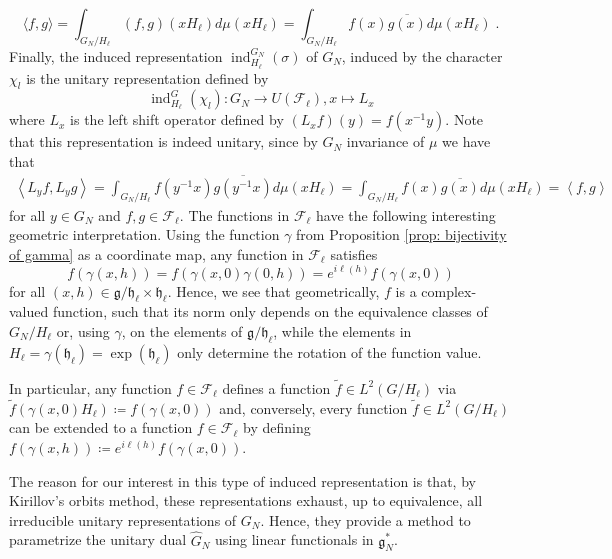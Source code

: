 \documentclass[pdflatex,sn-mathphys-num]{sn-jnl}
\theoremstyle{thmstyletwo}
\theoremstyle{thmstyleone}
\theoremstyle{thmstyletwo}
\newcommand{\fancyh}{\mathfrak{h}}
\newcommand{\fancyg}{\mathfrak{g}}
\begin{document}
	\begin{equation*}
		\langle f, g\rangle=\int_{G_N/H_{\ell}} (f,g)(xH_{\ell})d \mu(x H_{\ell}) = \int_{G_N/H_{\ell}} f(x)\overline{g(x)}d \mu(xH_{\ell})\;.
	\end{equation*}
	Finally, the induced representation $\operatorname{ind}_{H_{\ell}}^{G_N}(\sigma)$ of $G_N$, induced by the character $\chi_l$ is the unitary representation defined by
	\begin{equation*}
		\operatorname{ind}_{H_\ell}^{G}(\chi_l): G_N \to U(\mathcal{F}_\ell), x \mapsto L_x
	\end{equation*}
	where $L_x$ is the left shift operator defined by $(L_xf)(y) = f(x^{-1}y)$. Note that this representation is indeed unitary, since by $G_N$ invariance of $\mu$ we have that 
	\begin{align*}
		\left\langle L_yf, L_yg\right\rangle = \int_{G_N/H_{\ell}} f(y^{-1}x)\overline{g(y^{-1}x)}d \mu(xH_{\ell}) =  \int_{G_N/H_{\ell}} f(x)\overline{g(x)}d \mu(xH_{\ell}) =\left\langle f, g\right\rangle
	\end{align*}
	for all $y \in G_N$ and $f,g \in \mathcal{F}_\ell$.
	The functions in $\mathcal{F}_\ell$ have the following interesting geometric interpretation. Using the function $\gamma$ from Proposition \ref{prop: bijectivity of gamma} as a coordinate map, any function in $\mathcal{F}_\ell$ satisfies
	\begin{equation*}
		f(\gamma(x,h)) = f(\gamma(x,0)\gamma(0,h)) = e^{i\ell(h)}f(\gamma(x,0))
	\end{equation*}
	for all $(x,h) \in \fancyg/\fancyh_\ell \times \fancyh_\ell$. Hence, we see that geometrically, $f$ is a complex-valued function, such that its norm only depends on the equivalence classes of $G_N/H_\ell$ or, using $\gamma$, on the elements of $\fancyg/\fancyh_\ell$, while the elements in $H_\ell = \gamma(\fancyh_\ell) = \exp(\fancyh_\ell)$ only determine the rotation of the function value. 
    
    In particular, any function $f \in \mathcal{F}_\ell$ defines a function $\tilde{f} \in L^2(G/H_{\ell})$ via $\tilde{f}(\gamma(x,0)H_\ell) \coloneqq f(\gamma(x,0))$ and, conversely, every function $\tilde{f} \in L^2(G/H_{\ell})$ can be extended to a function $f \in \mathcal{F}_\ell$ by defining $f(\gamma(x,h)) \coloneqq e^{i\ell(h)}f(\gamma(x,0))$.
	
	The reason for our interest in this type of induced representation is that, by Kirillov's orbits method, these representations exhaust, up to equivalence, all irreducible unitary representations of $G_N$. Hence, they provide a method to parametrize the unitary dual $\hat{G}_N$ using linear functionals in $\fancyg_N^*$.
	
\end{document}
